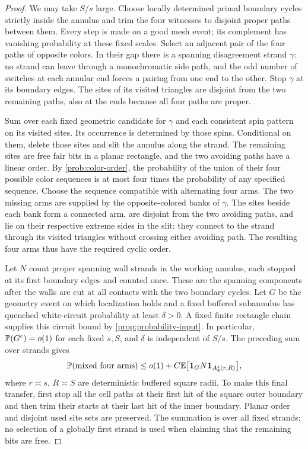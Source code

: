 \begin{proof}
We may take $S/s$ large.  Choose locally determined primal boundary
cycles strictly inside the annulus and trim the four witnesses to
disjoint proper paths between them.  Every step is made on a good mesh
event; its complement has vanishing probability at these fixed scales.
Select an adjacent pair of the four paths of opposite colors.  In their
gap there is a spanning disagreement strand $\gamma$: no strand can
leave through a monochromatic side path, and the odd number of switches
at each annular end forces a pairing from one end to the other.  Stop
$\gamma$ at its boundary edges.  The sites of its visited triangles are
disjoint from the two remaining paths, also at the ends because all four
paths are proper.

Sum over each fixed geometric candidate for $\gamma$ and each consistent
spin pattern on its visited sites.  Its occurrence is determined by
those spins.  Conditional on them, delete those sites and slit the annulus
along the strand.  The remaining sites are free fair bits in a planar
rectangle, and the two avoiding paths have a linear order.  By
\cref{prob:color-order}, the probability of the union of their four possible
color sequences is at most four times the probability of any specified
sequence.  Choose the sequence compatible with alternating four arms.
The two missing arms are supplied by the opposite-colored banks of
$\gamma$.  The sites beside each bank form a connected arm, are disjoint
from the two avoiding paths, and lie on their respective extreme sides
in the slit: they connect to the strand through its visited triangles
without crossing either avoiding path.  The resulting four arms thus
have the required cyclic order.

Let $N$ count proper spanning wall strands in the working annulus, each
stopped at its first boundary edges and counted once.  These are the
spanning components after the walls are cut at all contacts with the two
boundary cycles.  Let $G$ be the geometry event on which localization
holds and a fixed buffered subannulus has quenched white-circuit
probability at least $\delta>0$.  A fixed finite rectangle chain supplies
this circuit bound by \cref{prop:probability-input}.  In particular,
$\mathbb P(G^c)=o(1)$ for each fixed $s,S$, and $\delta$ is independent of
$S/s$.  The preceding sum over strands gives
\begin{equation}\label{prob:strand-reduction}
 \mathbb P(\text{mixed four arms})
 \le o(1)+C\mathbb E\bigl[\mathbf 1_G N\mathbf 1_{A_4^\varepsilon(r,R)}\bigr],
\end{equation}
where $r\asymp s$, $R\asymp S$ are deterministic buffered square radii.
To make this final transfer, first stop all the cell paths at their first
hit of the square outer boundary and then trim their starts at their last
hit of the inner boundary.  Planar order and disjoint used site sets are
preserved.  The summation is over all fixed strands; no selection of a
globally first strand is used when claiming that the remaining bits are
free.


\end{proof}
